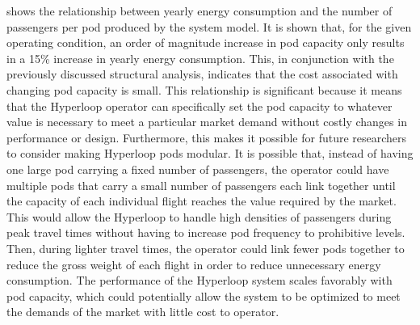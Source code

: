  shows the relationship between yearly
energy consumption and the number of passengers per pod produced by the system model.
It is shown that, for the given operating condition, an order of magnitude
increase in pod capacity only results in a 15\% increase in yearly energy consumption.
This, in conjunction with the previously discussed structural analysis,
indicates that the cost associated with changing pod capacity is small.
This relationship is significant because it means that the Hyperloop operator
can specifically set the pod capacity to whatever value is necessary to meet a
particular market demand without costly changes in performance or design.
Furthermore, this makes it possible for future researchers to consider making
Hyperloop pods modular. It is possible that, instead of having one large pod
carrying a fixed number of passengers, the operator could have multiple pods
that carry a small number of passengers each link together until the capacity
of each individual flight reaches the value required by the market.
This would allow the Hyperloop to handle high densities of passengers during
peak travel times without having to increase pod frequency to prohibitive levels.
Then, during lighter travel times, the operator could link fewer pods together
to reduce the gross weight of each flight in order to reduce unnecessary energy consumption.
The performance of the Hyperloop system scales favorably with pod capacity,
which could potentially allow the system to be optimized to meet the demands
of the market with little cost to operator.
